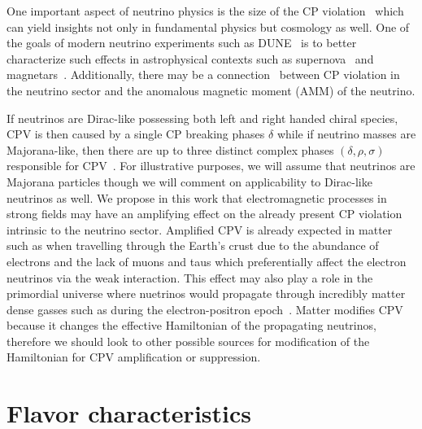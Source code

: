 One important aspect of neutrino physics is the size of the CP violation~\citep{wolfenstein1978oscillations,xing2001commutators,giunti2007fundamentals,huber2022snowmass} which can yield insights not only in fundamental physics but cosmology as well. One of the goals of modern neutrino experiments such as DUNE~\citep{abi2020long} is to better characterize such effects in astrophysical contexts such as supernova~\citep{abi2021supernova,abi2021prospects,athar2022status} and magnetars~\citep{lichkunov2019neutrino}. Additionally, there may be a connection~\citep{pehlivan2014neutrino,balaji2020cpa,balaji2020cpb} between CP violation in the neutrino sector and the anomalous magnetic moment (AMM) of the neutrino.

If neutrinos are Dirac-like possessing both left and right handed chiral species, CPV is then caused by a single CP breaking phases $\delta$ while if neutrino masses are Majorana-like, then there are up to three distinct complex phases $(\delta,\rho,\sigma)$ responsible for CPV~\citep{giunti2007fundamentals}. For illustrative purposes, we will assume that neutrinos are Majorana particles though we will comment on applicability to Dirac-like neutrinos as well. We propose in this work that electromagnetic processes in strong fields may have an amplifying effect on the already present CP violation intrinsic to the neutrino sector. Amplified CPV is already expected in matter~\citep{harrison2000cp} such as when travelling through the Earth's crust due to the abundance of electrons and the lack of muons and taus which preferentially affect the electron neutrinos via the weak interaction. This effect may also play a role in the primordial universe where nuetrinos would propagate through incredibly matter dense gasses such as during the electron-positron epoch~\citep{rafelski2023short}. Matter modifies CPV because it changes the effective Hamiltonian of the propagating neutrinos, therefore we should look to other possible sources for modification of the Hamiltonian for CPV amplification or suppression.

\section{Flavor characteristics}\label{sec:flavor}

